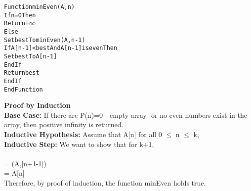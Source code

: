 \documentclass{article}
\begin{document}
    \begin{alltt}
Function minEven(A,n)
  If n = 0 Then
    Return +\ensuremath{\infty}
  Else
    Set best To minEven(A,n-1)
    If A[n-1] < best And A[n-1] is even Then
      Set best To A[n-1]
    EndIf
    Return best
  EndIf
EndFunction
    \end{alltt}

    \textbf{Proof by Induction}\\

    \textbf{Base Case:} If there  are P(n)=0 - empty array- or no  even  numbers exist \indent in the array,  then positive infinity  is returned. \\

    \textbf{Inductive Hypothesis:}
    Assume that A[n] for all 0 $\leq$ n $\leq$ k, \\

    \textbf{Inductive Step:} We want to show that for k+1, \\ \\
    \indent = (A,[n+1-1]) \\
    \indent = A[n] \\

    Therefore, by proof of induction, the function minEven holds true.




\end{document}
